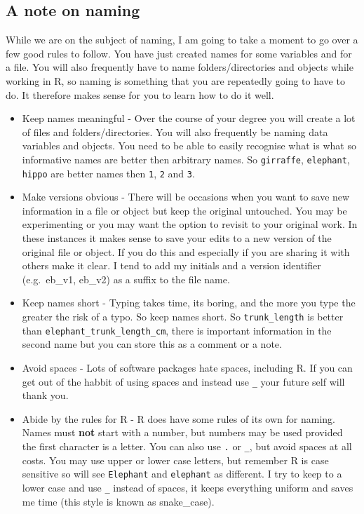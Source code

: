 \documentclass[
]{book}
\begin{document}
\subsection{A note on naming}\label{a-note-on-naming}

While we are on the subject of naming, I am going to take a moment to go over a few good rules to follow. You have just created names for some variables and for a file. You will also frequently have to name folders/directories and objects while working in R, so naming is something that you are repeatedly going to have to do. It therefore makes sense for you to learn how to do it well.

\begin{itemize}
\item
  Keep names meaningful - Over the course of your degree you will create a lot of files and folders/directories. You will also frequently be naming data variables and objects. You need to be able to easily recognise what is what so informative names are better then arbitrary names. So \texttt{girraffe}, \texttt{elephant}, \texttt{hippo} are better names then \texttt{1}, \texttt{2} and \texttt{3}.
\item
  Make versions obvious - There will be occasions when you want to save new information in a file or object but keep the original untouched. You may be experimenting or you may want the option to revisit to your original work. In these instances it makes sense to save your edits to a new version of the original file or object. If you do this and especially if you are sharing it with others make it clear. I tend to add my initials and a version identifier (e.g.~eb\_v1, eb\_v2) as a suffix to the file name.
\item
  Keep names short - Typing takes time, its boring, and the more you type the greater the risk of a typo. So keep names short. So \texttt{trunk\_length} is better than \texttt{elephant\_trunk\_length\_cm}, there is important information in the second name but you can store this as a comment or a note.
\item
  Avoid spaces - Lots of software packages hate spaces, including R. If you can get out of the habbit of using spaces and instead use \texttt{\_} your future self will thank you.
\item
  Abide by the rules for R - R does have some rules of its own for naming. Names must \textbf{not} start with a number, but numbers may be used provided the first character is a letter. You can also use \texttt{.} or \texttt{\_}, but avoid spaces at all costs. You may use upper or lower case letters, but remember R is case sensitive so will see \texttt{Elephant} and \texttt{elephant} as different. I try to keep to a lower case and use \texttt{\_} instead of spaces, it keeps everything uniform and saves me time (this style is known as snake\_case).
\end{itemize}
\end{document}
